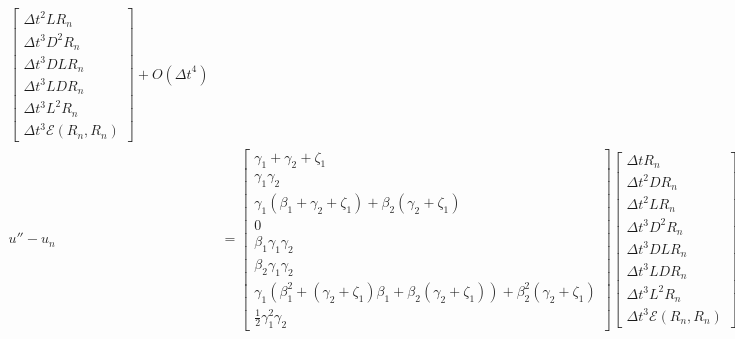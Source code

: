 \documentclass[letterpaper,11pt]{amsart}
\newcommand{\order}[2]{\ensuremath{O\!\left( {#1}^{#2} \right)}}
\begin{document}
\begin{align}
\begin{bmatrix}
  \Delta{}t^{2} L R_{n} \\
  \Delta{}t^{3} D^{2} R_{n} \\
  \Delta{}t^{3} D L R_{n} \\
  \Delta{}t^{3} L D R_{n} \\
  \Delta{}t^{3} L^{2} R_{n} \\
  \Delta{}t^{3} \mathcal{E}\left( R_{n}, R_{n} \right)
\end{bmatrix}
  + \order{\Delta{}t}{4}
\\
  u'' - u_{n}
  &=
\begin{bmatrix}
  \gamma_{1} + \gamma_{2} + \zeta_{1} \\
  \gamma_{1} \gamma_{2} \\
    \gamma_{1} \left(\beta_{1} + \gamma_{2} + \zeta_{1}\right)
  + \beta_{2} \left(\gamma_{2} + \zeta_{1}\right) \\
  0 \\
  \beta_{1} \gamma_{1} \gamma_{2} \\
  \beta_{2} \gamma_{1} \gamma_{2} \\
    \gamma_{1} \left(
        \beta_{1}^2 + \left(\gamma_{2} + \zeta_{1}\right) \beta_{1}
      + \beta_{2} \left(\gamma_{2} + \zeta_{1}\right)
    \right)
    + \beta_{2}^2 \left(\gamma_{2} + \zeta_{1}\right)
  \\
  \frac{1}{2} \gamma_{1}^{2} \gamma_{2}
\end{bmatrix}
\begin{bmatrix}
  \Delta{}t R_{n} \\
  \Delta{}t^{2} D R_{n} \\
  \Delta{}t^{2} L R_{n} \\
  \Delta{}t^{3} D^{2} R_{n} \\
  \Delta{}t^{3} D L R_{n} \\
  \Delta{}t^{3} L D R_{n} \\
  \Delta{}t^{3} L^{2} R_{n} \\
  \Delta{}t^{3} \mathcal{E}\left( R_{n}, R_{n} \right)
\end{bmatrix}
  + \order{\Delta{}t}{4}
\end{align}
\end{document}
